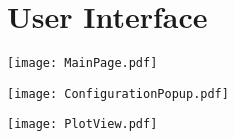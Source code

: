 \section{User Interface}

\texttt{[image: MainPage.pdf]}

\texttt{[image: ConfigurationPopup.pdf]}

\texttt{[image: PlotView.pdf]}
